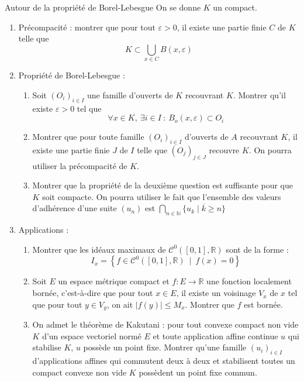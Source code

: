 \documentclass[french]{book}
\newcommand{\N}{\mathbb{N}}
\newcommand{\R}{\mathbb{R}}
\theoremstyle{definition}
\theoremstyle{remark}
\begin{document}
\begin{exo}[3]{Autour de la propriété de Borel-Lebesgue}
	On se donne $K$ un compact.
	\begin{enumerate}
		\item  Précompacité : montrer que pour tout $\varepsilon>0$, il existe une partie finie $C$ de $K$ telle que $$K\subset\bigcup_{x\in C}B(x,\varepsilon)$$
		\item Propriété de Borel-Lebesgue :
		\begin{enumerate}[label=\alph*.]
			\item Soit $(O_i)_{i\in I}$ une famille d'ouverts de $K$ recouvrant $K$. Montrer qu'il existe $\varepsilon>0$ tel que $$\forall x\in K,\ \exists i\in I\ : \ B_o(x,\varepsilon)\subset O_i$$
			\item Montrer que pour toute famille $(O_i)_{i\in I}$ d'ouverts de $A$ recouvrant $K$, il existe une partie finie $J$ de $I$ telle que $(O_j)_{j\in J}$ recouvre $K$. On pourra utiliser la précompacité de $K$.
			\item Montrer que la propriété de la deuxième question est suffisante pour que $K$ soit compacte. On pourra utiliser le fait que l'ensemble des valeurs d'adhérence d'une suite $(u_n)$ est $\displaystyle\bigcap_{n\in\N}\overline{\{u_k\mid k\geqslant n\}}$
		\end{enumerate}
		\item Applications :
		\begin{enumerate}[label=\alph*.]
			\item Montrer que les idéaux maximaux de $\mathcal{C}^0([0,1],\R)$ sont de la forme : $$I_x=\left\{f\in\mathcal{C}^0([0,1],\R)\ \mid\ f(x)=0\right\}$$
			\item Soit $E$ un espace métrique compact et $f:E\to\R$ une fonction localement bornée, c'est-à-dire que pour tout $x\in E$, il existe un voisinage $V_x$ de $x$ tel que pour tout $y\in V_y$, on ait $\lvert f(y)\rvert\leqslant M_x$. Montrer que $f$ est bornée.
			\item On admet le théorème de Kakutani : pour tout convexe compact non vide $K$ d'un espace vectoriel normé $E$ et toute application affine continue $u$ qui stabilise $K$, $u$ possède un point fixe. Montrer qu'une famille $(u_i)_{i\in I}$ d'applications affines qui commutent deux à deux et stabilisent toutes un compact convexe non vide $K$ possèdent un point fixe commun.
		\end{enumerate}
	\end{enumerate}
\end{exo}
\end{document}
